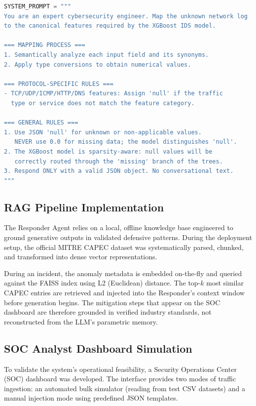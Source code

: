 \documentclass[conference]{IEEEtran}
\begin{document}
\noindent\begin{minipage}{\linewidth}
\begin{lstlisting}[language=Python, caption={Actual constrained system prompt used by the Normalizer Agent to ensure schema-agnostic mapping and sparsity-aware outputs.}, label={lst:prompt_norm}]
SYSTEM_PROMPT = """
You are an expert cybersecurity engineer. Map the unknown network log 
to the canonical features required by the XGBoost IDS model.

=== MAPPING PROCESS ===
1. Semantically analyze each input field and its synonyms.
2. Apply type conversions to obtain numerical values.

=== PROTOCOL-SPECIFIC RULES ===
- TCP/UDP/ICMP/HTTP/DNS features: Assign 'null' if the traffic 
  type or service does not match the feature category.

=== GENERAL RULES ===
1. Use JSON 'null' for unknown or non-applicable values. 
   NEVER use 0.0 for missing data; the model distinguishes 'null'.
2. The XGBoost model is sparsity-aware: null values will be 
   correctly routed through the 'missing' branch of the trees.
3. Respond ONLY with a valid JSON object. No conversational text.
"""
\end{lstlisting}
\end{minipage}

\subsection{RAG Pipeline Implementation}
The Responder Agent relies on a local, offline knowledge base engineered to ground generative outputs in validated defensive patterns. During the deployment setup, the official MITRE CAPEC dataset was systematically parsed, chunked, and transformed into dense vector representations.

During an incident, the anomaly metadata is embedded on-the-fly and queried against the FAISS index using L2 (Euclidean) distance. The top-$k$ most similar CAPEC entries are retrieved and injected into the Responder's context window before generation begins. The mitigation steps that appear on the SOC dashboard are therefore grounded in verified industry standards, not reconstructed from the LLM's parametric memory.

\subsection{SOC Analyst Dashboard Simulation}
To validate the system's operational feasibility, a Security Operations Center (SOC) dashboard was developed. The interface provides two modes of traffic ingestion: an automated bulk simulator (reading from test CSV datasets) and a manual injection mode using predefined JSON templates.
\end{document}
